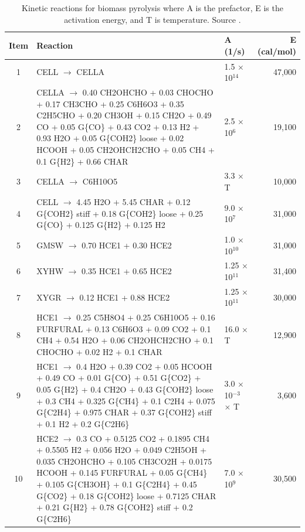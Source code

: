 \begin{center}
    \footnotesize
    \setlength\LTleft{-1in}
    \setlength\LTright{-1in}
    \begin{longtable}{cp{4in}lr}
        \caption{Kinetic reactions for biomass pyrolysis where A is the prefactor, E is the activation energy, and T is temperature. Source \cite{Debiagi-2018}.}
        \label{tab:chem-kinetics} \\
        \toprule
        Item & Reaction & A (1/s) & E (cal/mol) \\
        \midrule
        1  & CELL $\rightarrow$ CELLA & 1.5 $\times$ 10$^{14}$ & 47,000 \\
        2  & CELLA $\rightarrow$ 0.40 CH2OHCHO + 0.03 CHOCHO + 0.17 CH3CHO + 0.25 C6H6O3 + 0.35 C2H5CHO + 0.20 CH3OH + 0.15 CH2O + 0.49 CO + 0.05 G\{CO\} + 0.43 CO2 + 0.13 H2 + 0.93 H2O + 0.05 G\{COH2\} loose + 0.02 HCOOH + 0.05 CH2OHCH2CHO + 0.05 CH4 + 0.1 G\{H2\} + 0.66 CHAR & 2.5 $\times$ 10$^6$ & 19,100 \\
        3  & CELLA $\rightarrow$ C6H10O5 & 3.3 $\times$ T & 10,000 \\
        4  & CELL $\rightarrow$ 4.45 H2O + 5.45 CHAR + 0.12 G\{COH2\} stiff + 0.18 G\{COH2\} loose + 0.25 G\{CO\} + 0.125 G\{H2\} + 0.125 H2 & 9.0 $\times$ 10$^7$ & 31,000 \\
        5  & GMSW $\rightarrow$ 0.70 HCE1 + 0.30 HCE2 & 1.0 $\times$ 10$^{10}$ & 31,000 \\
        6  & XYHW $\rightarrow$ 0.35 HCE1 + 0.65 HCE2 & 1.25 $\times$ 10$^{11}$ & 31,400 \\
        7  & XYGR $\rightarrow$ 0.12 HCE1 + 0.88 HCE2 & 1.25 $\times$ 10$^{11}$ & 30,000 \\
        8  & HCE1 $\rightarrow$ 0.25 C5H8O4 + 0.25 C6H10O5 + 0.16 FURFURAL + 0.13 C6H6O3 + 0.09 CO2 + 0.1 CH4 + 0.54 H2O + 0.06 CH2OHCH2CHO + 0.1 CHOCHO + 0.02 H2 + 0.1 CHAR & 16.0 $\times$ T & 12,900 \\
        9  & HCE1 $\rightarrow$ 0.4 H2O + 0.39 CO2 + 0.05 HCOOH + 0.49 CO + 0.01 G\{CO\} + 0.51 G\{CO2\} + 0.05 G\{H2\} + 0.4 CH2O + 0.43 G\{COH2\} loose + 0.3 CH4 + 0.325 G\{CH4\} + 0.1 C2H4 + 0.075 G\{C2H4\} + 0.975 CHAR + 0.37 G\{COH2\} stiff + 0.1 H2 + 0.2 G\{C2H6\} & 3.0 $\times$ 10$^{-3}$ $\times$ T & 3,600 \\
        10 & HCE2 $\rightarrow$ 0.3 CO + 0.5125 CO2 + 0.1895 CH4 + 0.5505 H2 + 0.056 H2O + 0.049 C2H5OH + 0.035 CH2OHCHO + 0.105 CH3CO2H + 0.0175 HCOOH + 0.145 FURFURAL + 0.05 G\{CH4\} + 0.105 G\{CH3OH\} + 0.1 G\{C2H4\} + 0.45 G\{CO2\} + 0.18 G\{COH2\} loose + 0.7125 CHAR + 0.21 G\{H2\} + 0.78 G\{COH2\} stiff + 0.2 G\{C2H6\} & 7.0 $\times$ 10$^9$ & 30,500 \\

\end{longtable}
\end{center}

